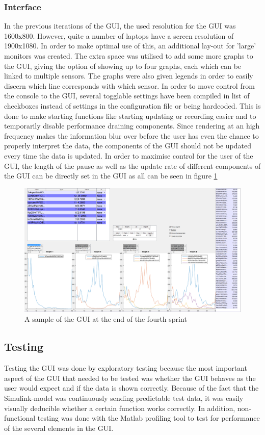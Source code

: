 \subsubsection{Interface}
\label{sec:GUIS4}
In the previous iterations of the GUI, the used resolution for the GUI was 1600x800. However, quite a number of laptops have a screen resolution of 1900x1080. In order to make optimal use of this, an additional lay-out for 'large' monitors was created. The extra space was utilised to add some more graphs to the GUI, giving the option of showing up to four graphs, each which can be linked to multiple sensors. The graphs were also given legends in order to easily discern which line corresponds with which sensor. 
In order to move control from the console to the GUI, several togglable settings have been compiled in list of checkboxes instead of settings in the configuration file or being hardcoded. This is done to make starting functions like starting updating or recording easier and to temporarily disable performance draining components.
Since rendering at an high frequency makes the information blur over before the user has even the chance to properly interpret the data, the components of the GUI should not be updated every time the data is updated. In order to maximise control for the user of the GUI, the length of the pause as well as the update rate of different components of the GUI can be directly set in the GUI as all can be seen in figure \ref{fig:GUIV3}



\begin{figure}[H]
	\centering
	\includegraphics[width=.75\textwidth]{images/GUIV3}
	\caption{A sample of the GUI at the end of the fourth sprint} 
	\label{fig:GUIV3}
\end{figure} 

\subsection{Testing} 
\label{sec:GuiTest}
Testing the GUI was done by exploratory testing because the most important aspect of the GUI that needed to be tested was whether the GUI behaves as the user would expect and if the data is shown correctly. Because of the fact that the Simulink-model was continuously sending predictable test data, it was easily visually deducible whether a certain function works correctly.  In addition, non-functional testing was done with the Matlab profiling tool to test for performance of the several elements in the GUI. 